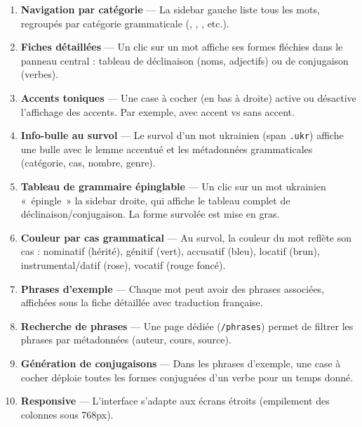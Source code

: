 \begin{enumerate}
  \item \textbf{Navigation par catégorie} --- La sidebar gauche liste tous les mots, regroupés par catégorie grammaticale (, , , etc.).

  \item \textbf{Fiches détaillées} --- Un clic sur un mot affiche ses formes fléchies dans le panneau central : tableau de déclinaison (noms, adjectifs) ou de conjugaison (verbes).

  \item \textbf{Accents toniques} --- Une case à cocher (en bas à droite) active ou désactive l'affichage des accents. Par exemple,  avec accent vs  sans accent.

  \item \textbf{Info-bulle au survol} --- Le survol d'un mot ukrainien (span \texttt{.ukr}) affiche une bulle avec le lemme accentué et les métadonnées grammaticales (catégorie, cas, nombre, genre).

  \item \textbf{Tableau de grammaire épinglable} --- Un clic sur un mot ukrainien «~épingle~» la sidebar droite, qui affiche le tableau complet de déclinaison/conjugaison. La forme survolée est mise en gras.

  \item \textbf{Couleur par cas grammatical} --- Au survol, la couleur du mot reflète son cas : nominatif (hérité), génitif (vert), accusatif (bleu), locatif (brun), instrumental/datif (rose), vocatif (rouge foncé).

  \item \textbf{Phrases d'exemple} --- Chaque mot peut avoir des phrases associées, affichées sous la fiche détaillée avec traduction française.

  \item \textbf{Recherche de phrases} --- Une page dédiée (\texttt{/phrases}) permet de filtrer les phrases par métadonnées (auteur, cours, source).

  \item \textbf{Génération de conjugaisons} --- Dans les phrases d'exemple, une case à cocher déploie toutes les formes conjuguées d'un verbe pour un temps donné.

  \item \textbf{Responsive} --- L'interface s'adapte aux écrans étroits (empilement des colonnes sous 768px).
\end{enumerate}

